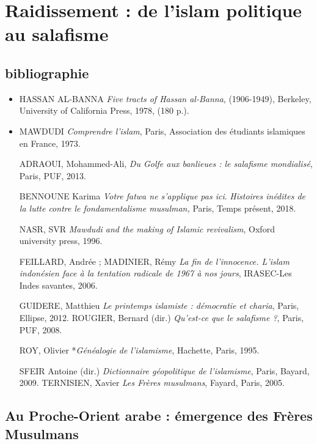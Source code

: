 
\chapter{{Raidissement : de l'islam politique au salafisme}}
 
 
 \section{bibliographie}
 
\begin{itemize}
\item

  HASSAN AL-BANNA \emph{Five tracts of Hassan al-Banna}, (1906-1949),
  Berkeley, University of California Press, 1978, (180 p.).

\item
  
  MAWDUDI \emph{Comprendre l'islam}, Paris, Association des étudiants
  islamiques en France, 1973.




ADRAOUI, Mohammed-Ali, \emph{Du Golfe aux banlieues : le salafisme
mondialisé}, Paris, PUF, 2013.

BENNOUNE Karima \emph{Votre fatwa ne s'applique pas ici}.
\emph{Histoires inédites de la lutte contre le fondamentalisme
musulman,} Paris, Temps présent, 2018.

NASR, SVR \emph{Mawdudi and the making of Islamic revivalism}, Oxford
university press, 1996.

FEILLARD, Andrée ; MADINIER, Rémy \emph{La fin de l'innocence. L'islam
indonésien face à la tentation radicale de 1967 à nos jours}, IRASEC-Les
Indes savantes, 2006.

GUIDERE, Matthieu \emph{Le printemps islamiste : démocratie et charia},
Paris, Ellipse, 2012. ROUGIER, Bernard (dir.) \emph{Qu'est-ce que le
salafisme ?}, Paris, PUF, 2008.

ROY, Olivier *\emph{Généalogie de l'islamisme}, Hachette, Paris, 1995.

SFEIR Antoine (dir.) \emph{Dictionnaire géopolitique de l'islamisme},
Paris, Bayard, 2009. TERNISIEN, Xavier \emph{Les Frères musulmans},
Fayard, Paris, 2005.
\end{itemize}



 
  \section{{Au Proche-Orient arabe} :
  {émergence des Frères
  Musulmans}}

